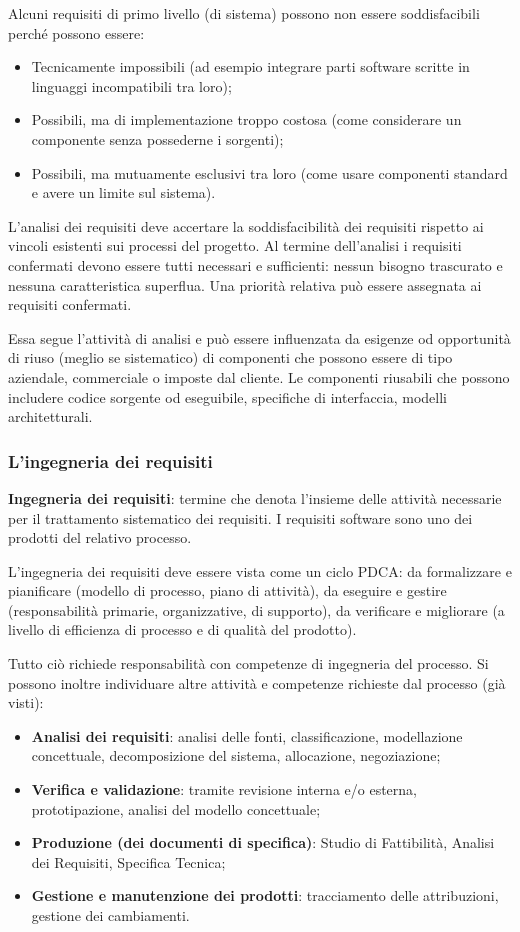 Alcuni requisiti di primo livello (di sistema) possono non essere soddisfacibili perché possono essere:
\begin{itemize}
\item Tecnicamente impossibili (ad esempio integrare parti software scritte in linguaggi incompatibili tra loro);
\item Possibili, ma di implementazione troppo costosa (come considerare un componente senza possederne i sorgenti);
\item Possibili, ma mutuamente esclusivi tra loro (come usare componenti standard e avere un limite sul sistema).
\end{itemize}
L'analisi dei requisiti deve accertare la soddisfacibilità dei requisiti rispetto ai vincoli esistenti sui processi del progetto. 
Al termine dell'analisi i requisiti confermati devono essere tutti necessari e sufficienti: nessun bisogno trascurato e nessuna caratteristica superflua. 
Una priorità relativa può essere assegnata ai requisiti confermati.

Essa segue l'attività di analisi e può essere influenzata da esigenze od opportunità di riuso (meglio se sistematico) di componenti che possono essere di tipo aziendale, commerciale o imposte dal cliente. 
Le componenti riusabili che possono includere codice sorgente od eseguibile, specifiche di interfaccia, modelli architetturali.

\subsubsection{L'ingegneria dei requisiti}
\textbf{Ingegneria dei requisiti}: termine che denota l'insieme delle attività necessarie per il trattamento sistematico dei requisiti. 
I requisiti software sono uno dei prodotti del relativo processo.

L'ingegneria dei requisiti deve essere vista come un ciclo PDCA: da formalizzare e pianificare (modello di processo, piano di attività), da eseguire e gestire (responsabilità primarie, organizzative, di supporto), da verificare e migliorare (a livello di efficienza di processo e di qualità del prodotto).

Tutto ciò richiede responsabilità con competenze di ingegneria del processo.
Si possono inoltre individuare altre attività e competenze richieste dal processo (già visti):
\begin{itemize}
\item \textbf{Analisi dei requisiti}: analisi delle fonti, classificazione, modellazione concettuale, decomposizione del sistema, allocazione, negoziazione;
\item \textbf{Verifica e validazione}: tramite revisione interna e/o esterna, prototipazione, analisi del modello concettuale;
\item \textbf{Produzione (dei documenti di specifica)}: Studio di Fattibilità, Analisi dei Requisiti, Specifica Tecnica;
\item \textbf{Gestione e manutenzione dei prodotti}: tracciamento delle attribuzioni, gestione dei cambiamenti.
\end{itemize}

